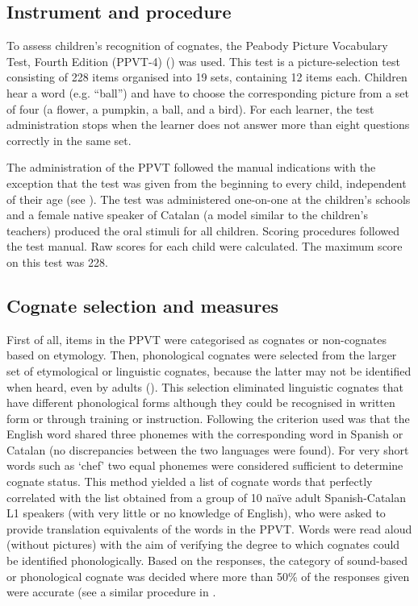 \documentclass[output=paper,modfonts,nonflat,newtxmath]{langsci/langscibook}
\begin{document}
\subsection{Instrument and procedure}

To assess children’s recognition of cognates, the Peabody Picture Vocabulary Test, Fourth Edition (PPVT-4) (\citealt{DunnDunn2007}) was used. This test is a picture-selection test consisting of 228 items organised into 19 sets, containing 12 items each. Children hear a word (e.g. “ball”) and have to choose the corresponding picture from a set of four (a flower, a pumpkin, a ball, and a bird). For each learner, the test administration stops when the learner does not answer more than eight questions correctly in the same set.

The administration of the PPVT followed the manual indications with the exception that the test was given from the beginning to every child, independent of their age (see \citealt{UnsworthEtAl2015}). The test was administered one-on-one at the children’s schools and a female native speaker of Catalan (a model similar to the children’s teachers) produced the oral stimuli for all children. Scoring procedures followed the test manual. Raw scores for each child were calculated. The maximum score on this test was 228.

\subsection{Cognate selection and measures} %

First of all, items in the PPVT were categorised as cognates or non-cognates based on etymology. Then, phonological cognates were selected from the larger set of etymological or linguistic cognates, because the latter may not be identified when heard, even by adults (\citealt{Stadthagen-GonzálezEtAl2013}). This selection eliminated linguistic cognates that have different phonological forms although they could be recognised in written form or through training or instruction. Following \citet{MendezPerezEtAl2010} the criterion used was that the English word shared three phonemes with the corresponding word in Spanish or Catalan (no discrepancies between the two languages were found). For very short words such as ‘chef’ two equal phonemes were considered sufficient to determine cognate status. This method yielded a list of cognate words that perfectly correlated with the list obtained from a group of 10 naïve adult Spanish-Catalan L1 speakers (with very little or no knowledge of English), who were asked to provide translation equivalents of the words in the PPVT. Words were read aloud (without pictures) with the aim of verifying the degree to which cognates could be identified phonologically. Based on the responses, the category of sound-based or phonological cognate was decided where more than 50\% of the responses given were accurate (see a similar procedure in \citealt{Stadthagen-GonzálezEtAl2013}.
\end{document}

